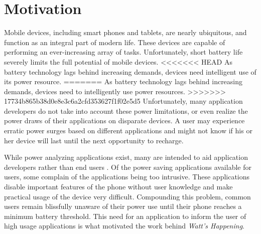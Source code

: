 \section*{Motivation}
\label{sec:motivation}
Mobile devices, including smart phones and tablets, are nearly ubiquitous, and function as an integral part of modern life. 
These devices are capable of performing an ever-increasing array of tasks. 
Unfortunately, short battery life severely limits the full potential of mobile devices. 
<<<<<<< HEAD
As battery technology lags behind increasing demands, devices need intelligent use of its power resource. 
=======
As battery technology lags behind increasing demands, devices need to intelligently use power resources. 
>>>>>>> 17734b865b38d0e8e3c6a2cfd353627f1f02e5d5
Unfortunately, many application developers do not take into account these power limitations, or even realize the power draws of their applications on disparate devices. 
A user may experience erratic power surges based on different applications and might not know if his or her device will last until the next opportunity to recharge. 

While power analyzing applications exist, many are intended to aid application developers rather than end users \cite{Pathak:2012:ESI:2168836.2168841} \cite{energy-aware}. 
Of the power saving applications available for users, some complain of the applications being too intrusive. 
These applications disable important features of the phone without user knowledge and make practical usage of the device very difficult. 
Compounding this problem, common users remain blissfully unaware of their power use until their phone reaches a minimum battery threshold.
This need for an application to inform the user of high usage applications is what motivated the work behind \emph{Watt's Happening}.
